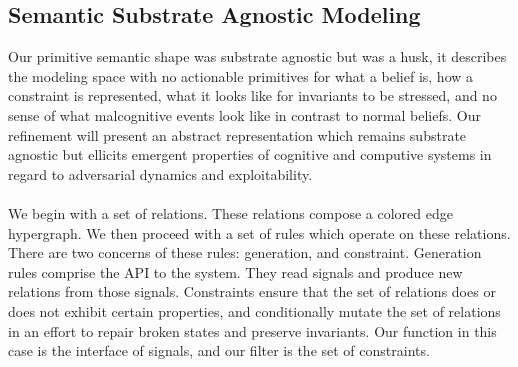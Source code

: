 \documentclass{article}
\begin{document}
	\subsection{Semantic Substrate Agnostic Modeling}
	Our primitive semantic shape was substrate agnostic but was a husk, it describes the modeling space with no actionable primitives for what a belief is, how a constraint is represented, what it looks like for invariants to be stressed, and no sense of what malcognitive events look like in contrast to normal beliefs. Our refinement will present an abstract representation which remains substrate agnostic but ellicits emergent properties of cognitive and computive systems in regard to adversarial dynamics and exploitability. \\\\
	We begin with a set of relations. These relations compose a colored edge hypergraph. We then proceed with a set of rules which operate on these relations. There are two concerns of these rules: generation, and constraint. Generation rules comprise the API to the system. They read signals and produce new relations from those signals. Constraints ensure that the set of relations does or does not exhibit certain properties, and conditionally mutate the set of relations in an effort to repair broken states and preserve invariants. Our function in this case is the interface of signals, and our filter is the set of constraints.\\\\
\end{document}
